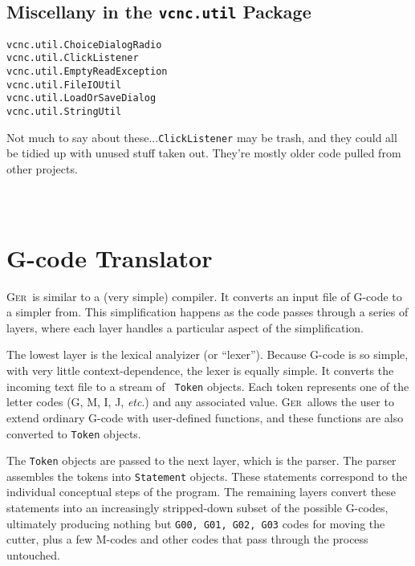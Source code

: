 \documentclass[titlepage,oneside,10pt]{article}
\newcommand{\ger}{\textsc{Ger}}
\begin{document}
\subsection{Miscellany in the {\tt vcnc.util} Package}

\begin{verbatim}
vcnc.util.ChoiceDialogRadio
vcnc.util.ClickListener
vcnc.util.EmptyReadException
vcnc.util.FileIOUtil
vcnc.util.LoadOrSaveDialog
vcnc.util.StringUtil
\end{verbatim}

Not much to say about these...{\tt ClickListener} may be trash, and
they could all be tidied up with unused stuff taken out. They're
mostly older code pulled from other projects.

\begin{verbatim}
\end{verbatim}
\begin{verbatim}
\end{verbatim}
\begin{verbatim}
\end{verbatim}

\section{G-code Translator}

\ger\ is similar to a (very simple) compiler. It converts an input
file of G-code to a simpler from. This simplification happens as the
code passes through a series of layers, where each layer handles a
particular aspect of the simplification.

The lowest layer is the lexical analyizer (or ``lexer''). Because
G-code is so simple, with very little context-dependence, the lexer is
equally simple. It converts the incoming text file to a stream of {\tt
  Token} objects. Each token represents one of the letter codes (G, M,
I, J, \emph{etc}.) and any associated value. \ger\ allows the user to
extend ordinary G-code with user-defined functions, and these
functions are also converted to {\tt Token} objects.

The {\tt Token} objects are passed to the next layer, which is the
parser. The parser assembles the tokens into {\tt Statement}
objects. These statements correspond to the individual conceptual
steps of the program. The remaining layers convert these statements
into an increasingly stripped-down subset of the possible
G-codes, ultimately producing nothing but {\tt G00, G01, G02, G03}
codes for moving the cutter, plus a few M-codes and other codes that
pass through the process untouched.
\end{document}
